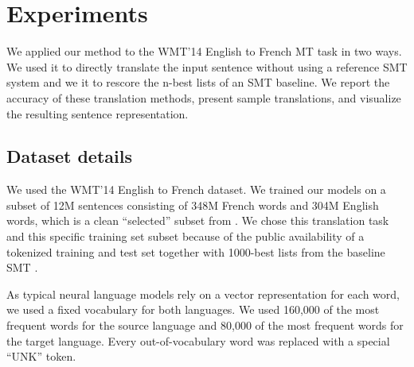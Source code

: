 \section{Experiments}
\label{sec:experiments}
 
We applied our method to the WMT'14 English to French MT task in two
ways.  We used it to directly translate the input sentence without
using a reference SMT system and we it to rescore the n-best lists of
an SMT baseline.  We report the accuracy of these translation methods,
present sample translations, and visualize the resulting sentence
representation.

\subsection{Dataset details}

We used the WMT'14 English to French dataset.  We trained our models
on a subset of 12M sentences consisting of 348M French words and 304M
English words, which is a clean ``selected'' subset from
\cite{wmt14_en_fr}. We chose this translation task and this specific
training set subset because of the public availability of a tokenized training and
test set together with 1000-best lists from the baseline SMT 
\cite{wmt14_en_fr}.

As typical neural language models rely on a vector representation for
each word, we used a fixed vocabulary for both languages.  We used
160,000 of the most frequent words for the source language and 80,000
of the most frequent words for the target language.  Every
out-of-vocabulary word was replaced with a special ``UNK'' token.  
 





